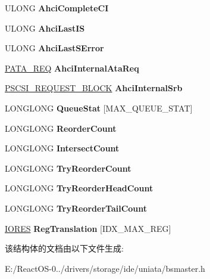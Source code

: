 \begin{DoxyCompactItemize}
U\+L\+O\+NG {\bfseries Ahci\+Complete\+CI}
\item 
\mbox{\label{struct___h_w___c_h_a_n_n_e_l_a6341f8ffd91b771b846784544eb00ed3}} 
U\+L\+O\+NG {\bfseries Ahci\+Last\+IS}
\item 
\mbox{\label{struct___h_w___c_h_a_n_n_e_l_a7b42c7bf8b8c220e66948157ac23a925}} 
U\+L\+O\+NG {\bfseries Ahci\+Last\+S\+Error}
\item 
\mbox{\label{struct___h_w___c_h_a_n_n_e_l_a40bc893445fdebe6818a007777c1c7c6}} 
\hyperlink{union___a_t_a___r_e_q}{P\+A\+T\+A\+\_\+\+R\+EQ} {\bfseries Ahci\+Internal\+Ata\+Req}
\item 
\mbox{\label{struct___h_w___c_h_a_n_n_e_l_ae28e2ef5fe46dd463841ecbcd67fcc66}} 
\hyperlink{struct___s_c_s_i___r_e_q_u_e_s_t___b_l_o_c_k}{P\+S\+C\+S\+I\+\_\+\+R\+E\+Q\+U\+E\+S\+T\+\_\+\+B\+L\+O\+CK} {\bfseries Ahci\+Internal\+Srb}
\item 
\mbox{\label{struct___h_w___c_h_a_n_n_e_l_adb38a7a5526bd7bcde93c09b434a3ab5}} 
L\+O\+N\+G\+L\+O\+NG {\bfseries Queue\+Stat} \mbox{[}M\+A\+X\+\_\+\+Q\+U\+E\+U\+E\+\_\+\+S\+T\+AT\mbox{]}
\item 
\mbox{\label{struct___h_w___c_h_a_n_n_e_l_ab757d7936001531e576b33a3e202890f}} 
L\+O\+N\+G\+L\+O\+NG {\bfseries Reorder\+Count}
\item 
\mbox{\label{struct___h_w___c_h_a_n_n_e_l_aa20fae73a1634059411ce742be95c474}} 
L\+O\+N\+G\+L\+O\+NG {\bfseries Intersect\+Count}
\item 
\mbox{\label{struct___h_w___c_h_a_n_n_e_l_ad580db32da47481ae869b1ccf2f90f6a}} 
L\+O\+N\+G\+L\+O\+NG {\bfseries Try\+Reorder\+Count}
\item 
\mbox{\label{struct___h_w___c_h_a_n_n_e_l_a4779b43b7082b949e3071b6384b295ee}} 
L\+O\+N\+G\+L\+O\+NG {\bfseries Try\+Reorder\+Head\+Count}
\item 
\mbox{\label{struct___h_w___c_h_a_n_n_e_l_ac88dbed0a78c3f67d8fbedf469c3a909}} 
L\+O\+N\+G\+L\+O\+NG {\bfseries Try\+Reorder\+Tail\+Count}
\item 
\mbox{\label{struct___h_w___c_h_a_n_n_e_l_a64efc72c899021801fc0ddb4b7665190}} 
\hyperlink{struct___i_o_r_e_s}{I\+O\+R\+ES} {\bfseries Reg\+Translation} \mbox{[}I\+D\+X\+\_\+\+M\+A\+X\+\_\+\+R\+EG\mbox{]}
\end{DoxyCompactItemize}


该结构体的文档由以下文件生成\+:\begin{DoxyCompactItemize}
\item 
E\+:/\+React\+O\+S-\/0../drivers/storage/ide/uniata/bsmaster.\+h\end{DoxyCompactItemize}
